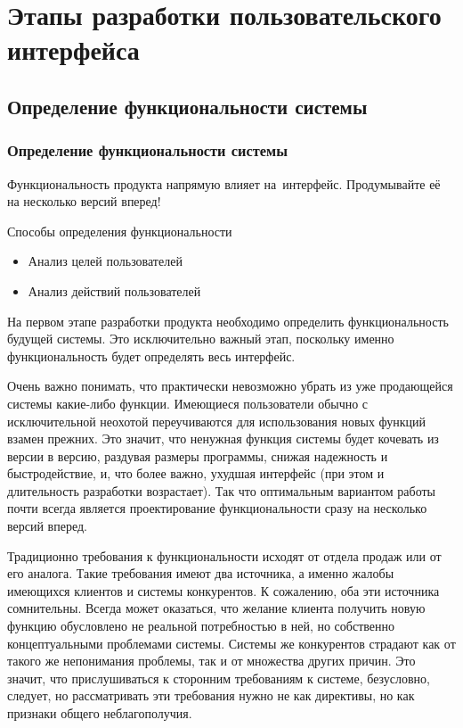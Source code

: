 \documentclass{../industrial-development}
\begin{document}
\section{Этапы разработки пользовательского интерфейса}

\subsection{Определение функциональности системы}

\begin{frame} \frametitle{Определение функциональности системы}

  \begin{block}{}
    Функциональность продукта напрямую влияет на~интерфейс. Продумывайте её на несколько версий вперед!
  \end{block}
  
  \begin{block}{Способы определения функциональности}
    \begin{itemize}
    \item Анализ целей пользователей
    \item Анализ действий пользователей
    \end{itemize}
  \end{block}
\end{frame}

\lecturenotes

На первом этапе разработки продукта необходимо определить функциональность будущей системы. Это исключительно важный этап, поскольку именно функциональность будет определять весь интерфейс.

Очень важно понимать, что практически невозможно убрать из уже продающейся системы какие-либо функции. Имеющиеся пользователи обычно с исключительной неохотой переучиваются для использования новых функций взамен прежних. Это значит, что ненужная функция системы будет кочевать из версии в версию, раздувая размеры программы, снижая надежность и быстродействие, и, что более важно, ухудшая интерфейс (при этом и длительность разработки возрастает). Так что оптимальным вариантом работы почти всегда является проектирование функциональности сразу на несколько версий вперед.

Традиционно требования к функциональности исходят от отдела продаж или от его аналога. Такие требования имеют два источника, а именно жалобы имеющихся клиентов и системы конкурентов. К сожалению, оба эти источника сомнительны. Всегда может оказаться, что желание клиента получить новую функцию обусловлено не реальной потребностью в ней, но собственно концептуальными проблемами системы. Системы же конкурентов страдают как от такого же непонимания проблемы, так и от множества других причин. Это значит, что прислушиваться к сторонним требованиям к системе, безусловно, следует, но рассматривать эти требования нужно не как директивы, но как признаки общего неблагополучия.
\end{document}
